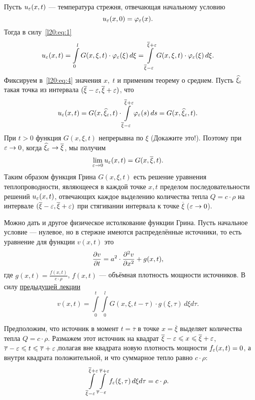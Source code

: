 Пусть $u_{\varepsilon}(x,t)$ --- температура стрежня, отвечающая начальному условию 
\begin{equation*}
	u_{\varepsilon}(x,0)=\varphi_{\varepsilon}(x).
\end{equation*} 
Тогда в силу~\eqref{l20:eq:1}
\begin{equation}\label{l20:eq:4}
	u_{\varepsilon}(x,t)=\int\limits_0^l G(x,\xi,t)\cdot\varphi_{\varepsilon}(\xi)\,d\xi=\int\limits_{\overline{\xi}-\varepsilon}^{\overline{\xi}+\varepsilon}G(x,\xi,t)\cdot\varphi_{\varepsilon}(\xi)\,d\xi.
\end{equation}
Фиксируем в~\eqref{l20:eq:4} значения $x,\;t$ и применим теорему о среднем. Пусть $\widehat{\xi}_{\varepsilon}$ такая точка из интервала $(\overline{\xi}-\varepsilon,\overline{\xi}+\varepsilon)$, что
\begin{equation*}
	u_{\varepsilon}(x,t)=G(x,\widehat{\xi}_{\varepsilon},t)\cdot\int\limits_{\overline{\xi}-\varepsilon}^{\overline{\xi}+\varepsilon}\varphi_{\varepsilon}(s)\,ds=G(x,\widehat{\xi}_{\varepsilon},t).
\end{equation*}
При $t>0$ функция $G(x,\xi,t)$ непрерывна по $\xi$ (Докажите это!). Поэтому при $\varepsilon\to0$, когда $\widehat{\xi}_{\varepsilon}\to\overline{\xi}$, мы получим
\begin{equation}\label{l20:eq:5}
	\lim\limits_{\varepsilon\to0}u_{\varepsilon}(x,t)=G(x,\overline{\xi},t).
\end{equation}
Таким образом функция Грина $G(x,\xi,t)$ есть решение уравнения теплопроводности, являющееся в каждой точке $x,t$ пределом последовательности решений $u_{\varepsilon}(x,t)$, отвечающих каждое выделению количества тепла $Q=c\cdot\rho$ на интервале $(\overline{\xi}-\varepsilon,\overline{\xi}+\varepsilon)$ при стягивании интервала к точке $\overline{\xi}$ ($\varepsilon\to0$).

Можно дать и другое физическое истолкование функции Грина. Пусть начальное условие --- нулевое, но в стержне имеются распределённые источники, то есть уравнение для функции $v(x,t)$ это 
\begin{equation*}
	\frac{\partial v}{\partial t}=a^2\cdot\frac{\partial^2v}{\partial x^2}+g(x,t),
\end{equation*}
где $\displaystyle g(x,t)=\frac{f(x,t)}{c\cdot\rho}$, $f(x,t)$ --- объёмная плотность мощности источников. В силу \hyperref[lecture19]{предыдущей лекции} 
\begin{equation}\label{l20:eq:6}
	v(x,t)=\int\limits_0^t\int\limits_0^l G(x,\xi,t-\tau)\cdot g(\xi,\tau)\,d\xi d\tau.
\end{equation}

Предположим, что источник в момент $t=\overline{\tau}$ в точке $x=\overline{\xi}$ выделяет количества тепла $Q=c\cdot\rho$. Размажем этот источник на квадрат $\overline{\xi}-\varepsilon\leqslant x\leqslant \overline{\xi}+\varepsilon$,
$\overline{\tau}-\varepsilon\leqslant t\leqslant \overline{\tau}+\varepsilon$,полагая вне квадрата новую плотность мощности $f_{\varepsilon}(x,t)=0$, а внутри квадрата положительной, и что суммарное тепло равно $c\cdot\rho$:
\begin{equation*}
	\int\limits_{\overline{\xi}-\varepsilon}^{\overline{\xi}+\varepsilon}\int\limits_{\overline{\tau}-\varepsilon}^{\overline{\tau}+\varepsilon} f_{\varepsilon}(\xi,\tau)\,d\xi d\tau=c\cdot\rho.
\end{equation*} 



